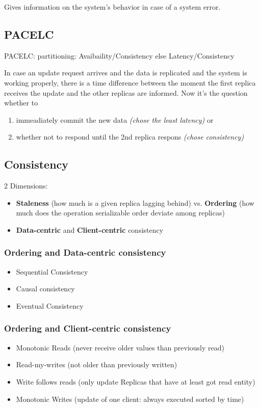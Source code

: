 \documentclass[a4paper,12pt]{article}%
\begin{document}
Gives information on the system's behavior in case of a system error.

\subsection{PACELC}
PACELC: partitioning: Avaibaility/Consistency else Latency/Consistency

In case an update request arrives and the data is replicated and the system is working properly,
there is a time difference between the moment the first replica receives the update and the other replicas are informed.
Now it's the question whether to 
\begin{enumerate}
 \item immeadiately commit the new data {\it (chose the least latency)} or 
 \item whether not to respond until the 2nd replica respons {\it (chose consistency)} 
\end{enumerate}


\subsection{Consistency}
2 Dimensions:
\begin{itemize}
	\item {\bf Staleness} (how much is a given replica lagging behind) vs. {\bf Ordering} (how much does the operation serializable order deviate among replicas)
	\item {\bf Data-centric} and {\bf Client-centric} consistency
\end{itemize}

\subsubsection{Ordering and Data-centric consistency}
\begin{itemize}
\item Sequential Consistency 
\item Causal consistency
\item Eventual Consistency
\end{itemize}
\subsubsection{Ordering and Client-centric consistency}
\begin{itemize}
	\item Monotonic Reads (never receive older values than previously read)
	\item Read-my-writes (not older than previously written)
	\item Write follows reads (only update Replicas that have at least got read entity)
	\item Monotonic Writes (update of one client: always executed sorted by time)
\end{itemize}
\newpage
 
\end{document}
